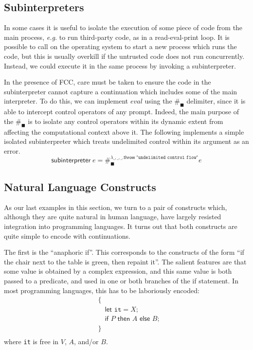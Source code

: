 \documentclass[11pt]{article}
\newcommand{\maybePage}{\null}
\begin{document}
\maybePage
\subsection{Subinterpreters}

In some cases it is useful to isolate the execution of some piece of code from the main process, \textit{e.g.} to run third-party code, as in a read-eval-print loop.
It is possible to call on the operating system to start a new process which runs the code, but this is usually overkill if the untrusted code does not run concurrently.
Instead, we could execute it in the same process by invoking a subinterpreter.

In the presence of FCC, care must be taken to ensure the code in the subinterpreter cannot capture a continuation which includes some of the main interpreter.
To do this, we can implement $eval$ using the $\#_\blacksquare$ delimiter, since it is able to intercept control operators of any prompt.
Indeed, the main purpose of the $\#_\blacksquare$ is to isolate any control operators within its dynamic extent from affecting the computational context above it.
The following implements a simple isolated subinterpreter which treats undelimited control within its argument as an error.
$$\textsf{subinterpreter}\;e = \#_\blacksquare^{\lambda\_,\_,\_.\textsf{throw}\;\texttt{"undelimited control flow"}}e$$


\maybePage
\subsection{Natural Language Constructs}

As our last examples in this section, we turn to a pair of constructs which, although they are quite natural in human language, have largely resisted integration into programming languages.
It turns out that both constructs are quite simple to encode with continuations.

The first is the ``anaphoric if''.
This corresponds to the constructs of the form ``if the chair next to the table is green, then repaint it''.
The salient features are that some value is obtained by a complex expression, and this same value is both passed to a predicate, and used in one or both branches of the if statement.
In most programming languages, this has to be laboriously encoded:
\begin{align*}
&\{ \\
&\quad \textsf{let }\texttt{it} = X; \\
&\quad \textsf{if }P\textsf{ then }A\textsf{ else }B; \\
&\} \\
\end{align*}
where \texttt{it} is free in $V$, $A$, and/or $B$.
\end{document}
